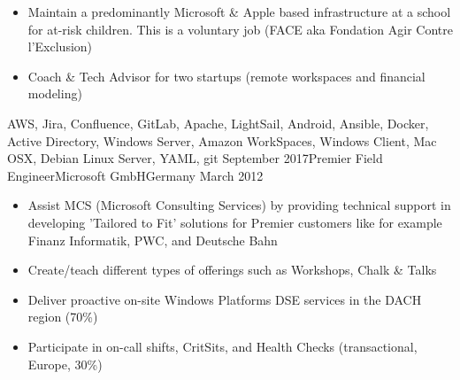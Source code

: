 \begin{experiences}
{\begin{itemize}
                        \item Maintain a predominantly Microsoft \& Apple based infrastructure at a school for at-risk children. This is a voluntary job (FACE aka Fondation Agir Contre l'Exclusion)

                        \item Coach \& Tech Advisor for two startups (remote workspaces and financial modeling)            
                      \end{itemize}
                    }
                    {AWS, Jira, Confluence, GitLab, Apache, LightSail, Android, Ansible, Docker, Active Directory, Windows Server, Amazon WorkSpaces, Windows Client, Mac OSX, Debian Linux Server, YAML, git}
  \emptySeparator
  \experience
    {September 2017}{Premier Field Engineer}{Microsoft GmbH}{Germany}
    {March 2012}    {
                      \begin{itemize}
                        \item Assist MCS (Microsoft Consulting Services) by providing technical support in developing 'Tailored to Fit' solutions for Premier customers like for example Finanz Informatik, PWC, and Deutsche Bahn

                        \item Create/teach different types of offerings such as Workshops, Chalk \& Talks  
                        
                        \item Deliver proactive on-site Windows Platforms DSE services in the DACH region (70\%)                   
 
                        \item Participate in on-call shifts, CritSits, and Health Checks (transactional, Europe, 30\%)    


\end{itemize}}
\end{experiences}
